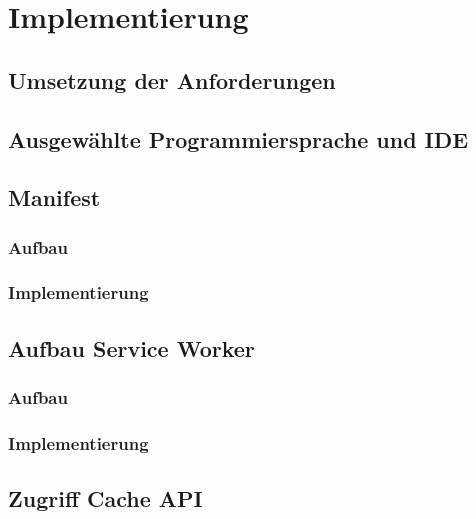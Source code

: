 \chapter{Implementierung}\label{chap:Implementierung}
\thispagestyle{standard}
\pagestyle{standard}

\section{Umsetzung der Anforderungen}\label{sub: Umsetzung der Anforderungen}


\section{Ausgewählte Programmiersprache und IDE}


\section{Manifest}
\subsection{Aufbau}
\subsection{Implementierung}



\section{Aufbau Service Worker}


\subsection{Aufbau}
\subsection{Implementierung}

\section{Zugriff Cache API}
